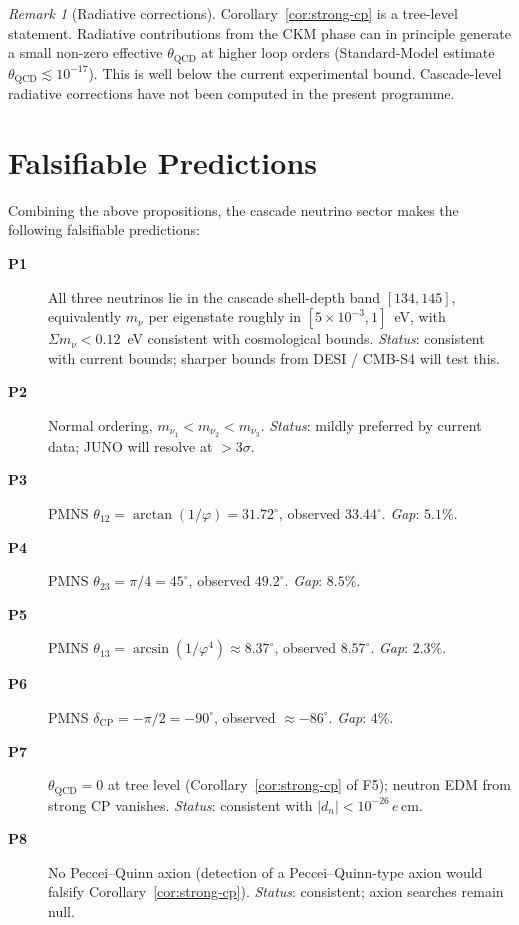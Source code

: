 \documentclass[12pt]{article}
\theoremstyle{definition}
\theoremstyle{remark}
\newtheorem{remark}[theorem]{Remark}
\begin{document}
\begin{remark}[Radiative corrections]
Corollary~\ref{cor:strong-cp} is a tree-level statement. Radiative contributions from the CKM phase can in principle generate a small non-zero effective $\theta_{\mathrm{QCD}}$ at higher loop orders (Standard-Model estimate $\theta_{\mathrm{QCD}} \lesssim 10^{-17}$). This is well below the current experimental bound. Cascade-level radiative corrections have not been computed in the present programme.
\end{remark}

\section{Falsifiable Predictions}\label{sec:predictions}

Combining the above propositions, the cascade neutrino sector makes the following falsifiable predictions:

\begin{description}
\item[\textbf{P1}] All three neutrinos lie in the cascade shell-depth band $[134, 145]$, equivalently $m_\nu$ per eigenstate roughly in $[5 \times 10^{-3}, 1]$~eV, with $\Sigma m_\nu < 0.12$~eV consistent with cosmological bounds. \emph{Status}: consistent with current bounds; sharper bounds from DESI / CMB-S4 will test this.
\item[\textbf{P2}] Normal ordering, $m_{\nu_1} < m_{\nu_2} < m_{\nu_3}$. \emph{Status}: mildly preferred by current data; JUNO will resolve at $> 3\sigma$.
\item[\textbf{P3}] PMNS $\theta_{12} = \arctan(1/\varphi) = 31.72^\circ$, observed $33.44^\circ$. \emph{Gap}: $5.1\%$.
\item[\textbf{P4}] PMNS $\theta_{23} = \pi/4 = 45^\circ$, observed $49.2^\circ$. \emph{Gap}: $8.5\%$.
\item[\textbf{P5}] PMNS $\theta_{13} = \arcsin(1/\varphi^4) \approx 8.37^\circ$, observed $8.57^\circ$. \emph{Gap}: $2.3\%$.
\item[\textbf{P6}] PMNS $\delta_{\mathrm{CP}} = -\pi/2 = -90^\circ$, observed $\approx -86^\circ$. \emph{Gap}: $4\%$.
\item[\textbf{P7}] $\theta_{\mathrm{QCD}} = 0$ at tree level (Corollary~\ref{cor:strong-cp} of F5); neutron EDM from strong CP vanishes. \emph{Status}: consistent with $|d_n| < 10^{-26}\,e\,\mathrm{cm}$.
\item[\textbf{P8}] No Peccei--Quinn axion (detection of a Peccei--Quinn-type axion would falsify Corollary~\ref{cor:strong-cp}). \emph{Status}: consistent; axion searches remain null.
\end{description}
\end{document}
